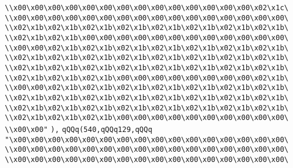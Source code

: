 \verb|\\x00\x00\x00\x00\x00\x00\x00\x00\x00\x00\x00\x00\x00\x00\x02\x1c\|\newline
\verb|\\x00\x00\x00\x00\x00\x00\x00\x00\x00\x00\x00\x00\x00\x00\x00\x00\|\newline
\verb|\\x02\x1b\x02\x1b\x02\x1b\x02\x1b\x02\x1b\x02\x1b\x02\x1b\x02\x1b\|\newline
\verb|\\x02\x1b\x02\x1b\x00\x00\x00\x00\x00\x00\x00\x00\x00\x00\x00\x00\|\newline
\verb|\\x00\x00\x02\x1b\x02\x1b\x02\x1b\x02\x1b\x02\x1b\x02\x1b\x02\x1b\|\newline
\verb|\\x02\x1b\x02\x1b\x02\x1b\x02\x1b\x02\x1b\x02\x1b\x02\x1b\x02\x1b\|\newline
\verb|\\x02\x1b\x02\x1b\x02\x1b\x02\x1b\x02\x1b\x02\x1b\x02\x1b\x02\x1b\|\newline
\verb|\\x02\x1b\x02\x1b\x02\x1b\x00\x00\x00\x00\x00\x00\x00\x00\x02\x1b\|\newline
\verb|\\x00\x00\x02\x1b\x02\x1b\x02\x1b\x02\x1b\x02\x1b\x02\x1b\x02\x1b\|\newline
\verb|\\x02\x1b\x02\x1b\x02\x1b\x02\x1b\x02\x1b\x02\x1b\x02\x1b\x02\x1b\|\newline
\verb|\\x02\x1b\x02\x1b\x02\x1b\x02\x1b\x02\x1b\x02\x1b\x02\x1b\x02\x1b\|\newline
\verb|\\x02\x1b\x02\x1b\x02\x1b\x00\x00\x00\x00\x00\x00\x00\x00\x00\x00\|\newline
\verb|\\x00\x00"|\newline
\verb|),|\newline
\verb|qQQq(540,qQQq129,qQQq|\newline
\verb|"\x00\x00\x00\x00\x00\x00\x00\x00\x00\x00\x00\x00\x00\x00\x00\x00\|\newline
\verb|\\x00\x00\x00\x00\x00\x00\x00\x00\x00\x00\x00\x00\x00\x00\x00\x00\|\newline
\verb|\\x00\x00\x00\x00\x00\x00\x00\x00\x00\x00\x00\x00\x00\x00\x00\x00\|\newline
